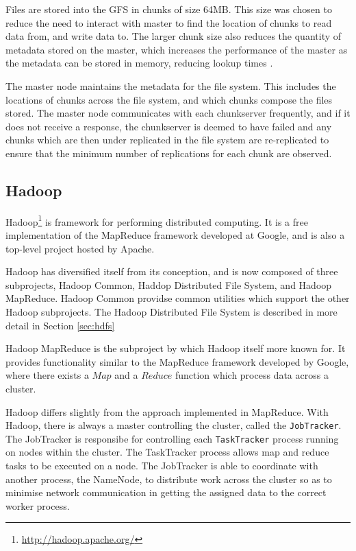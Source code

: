 Files are stored into the GFS in chunks of size 64MB. This size was chosen to reduce the need to interact with master to find the location of chunks to read data from, and write data to. The larger chunk size also reduces the quantity of metadata stored on the master, which increases the performance of the master as the metadata can be stored in memory, reducing lookup times \cite{gfs}.

The master node maintains the metadata for the file system. This includes the locations of chunks across the file system, and which chunks compose the files stored. The master node communicates with each chunkserver frequently, and if it does not receive a response, the chunkserver is deemed to have failed and any chunks which are then under replicated in the file system are re-replicated to ensure that the minimum number of replications for each chunk are observed.

\subsection{Hadoop}
Hadoop\footnote{\url{http://hadoop.apache.org/}} is framework for performing
distributed computing. It is a free implementation of the MapReduce framework
developed at Google, and is also a top-level project hosted by Apache.

Hadoop has diversified itself from its conception, and is now composed of three
subprojects, Hadoop Common, Haddop Distributed File System, and Hadoop
MapReduce. Hadoop Common providse common utilities which support the other
Hadoop subprojects. The Hadoop Distributed File System is described in more
detail in Section \ref{sec:hdfs}

Hadoop MapReduce is the subproject by which Hadoop itself more known for. It
provides functionality similar to the MapReduce framework developed by Google,
where there exists a $Map$ and a $Reduce$ function which process data across a
cluster.

Hadoop differs slightly from the approach implemented in MapReduce. With Hadoop, there is always a master controlling the cluster, called the \verb/JobTracker/. The JobTracker is responsibe for controlling each \verb/TaskTracker/ process running on nodes within the cluster. The TaskTracker process allows map and reduce tasks to be executed on a node. The JobTracker is able to coordinate with another process, the NameNode, to distribute work across the cluster so as to minimise network communication in getting the assigned data to the correct worker process.

